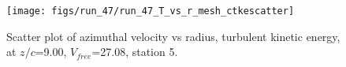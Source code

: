 \begin{figure}[H]
\centering
\texttt{[image: figs/run\_47/run\_47\_T\_vs\_r\_mesh\_ctkescatter]}
\caption{Scatter plot of azimuthal velocity vs radius, turbulent kinetic energy, at $z/c$=9.00, $V_{free}$=27.08, station 5.}
\label{fig:run_47_T_vs_r_mesh_ctkescatter}
\end{figure}


